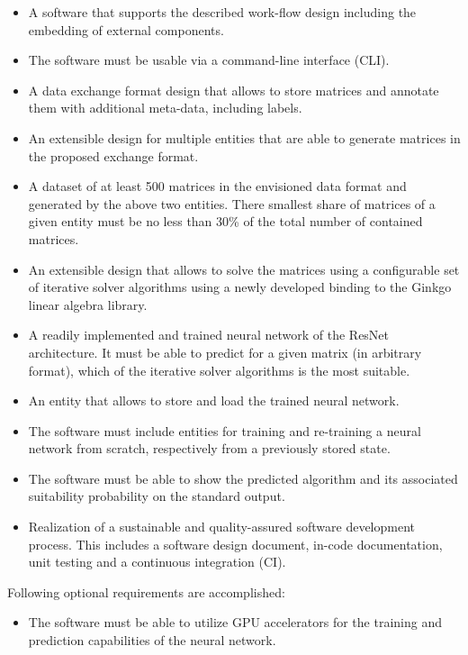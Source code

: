 \documentclass[parskip=full]{scrartcl}
\begin{document}
\begin{itemize}
\item A software that supports the described work-flow design including the embedding of external components.

\item The software must be usable via a \gls{command-line interface} (CLI).

\item A data exchange format design that allows to store matrices and annotate them with 
additional meta-data, including labels.

\item An extensible design for multiple entities that are able to generate matrices in the proposed exchange format.

\item A dataset of at least 500 matrices in the envisioned data format and generated by the above two entities. 
There smallest share of matrices of a given entity must be no less than 30\% of the total number of contained matrices.

\item An extensible design that allows to solve the matrices using a configurable set of \gls{iterative solver} algorithms using a newly developed binding to the \gls{Ginkgo} linear algebra library.

\item A readily implemented and trained \gls{neural network} of the \gls{ResNet} architecture. 
It must be able to predict for a given matrix (in arbitrary format), which of the \gls{iterative solver} algorithms is the most suitable.

\item An entity that allows to store and load the trained \gls{neural network}.

\item The software must include entities for training and re-training a \gls{neural network} from scratch, respectively from a previously stored state.

\item The software must be able to show the predicted \gls{algorithm} and its associated suitability probability on the standard output.

\item Realization of a sustainable and quality-assured software development process. 
This includes a software design document, in-code documentation, unit testing and a continuous integration (CI).

\end{itemize}
Following optional requirements are accomplished:
\begin{itemize}
\item The software must be able to utilize GPU accelerators for the training and prediction capabilities of the neural network.
\end{itemize}
\end{document}
